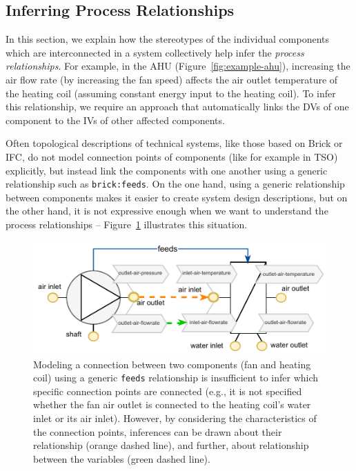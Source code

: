 \documentclass[sigconf]{acmart}
\begin{document}


\subsection{Inferring Process Relationships}
\label{subsec:process-relationship}
In this section, we explain how the stereotypes of the individual components which are interconnected in a system collectively help infer the \textit{process relationships}.
%
For example, in the AHU (Figure~\ref{fig:example-ahu}), increasing the air flow rate (by increasing the fan speed) affects the air outlet temperature of the heating coil (assuming constant energy input to the heating coil).
To infer this relationship, we require an approach that automatically links the DVs of one component to the IVs of other affected components.

Often topological descriptions of technical systems, like those based on Brick or IFC, do not model connection points of components (like for example in TSO) explicitly, but instead link the components with one another using a generic relationship such as \texttt{brick:feeds}.
On the one hand, using a generic relationship between components makes it easier to create system design descriptions, but on the other hand, it is not expressive enough when we want to understand the process relationships -- Figure~\ref{fig:feeds-is-insufficient} illustrates this situation.


\begin{figure}[t]
\centering
\includegraphics[width=0.9\linewidth]{figures/a_ipr_inter_connections.pdf}
\caption{Modeling a connection between two components (fan and heating coil) using a generic \texttt{feeds} relationship is insufficient to infer which specific connection points are connected (e.g., it is not specified whether the fan air outlet is connected to the heating coil's water inlet or its air inlet). However, by considering the characteristics of the connection points, inferences can be drawn about their relationship (orange dashed line), and further, about relationship between the variables (green dashed line).}
\label{fig:feeds-is-insufficient}
\vspace{-5mm}
\end{figure}
\end{document}
